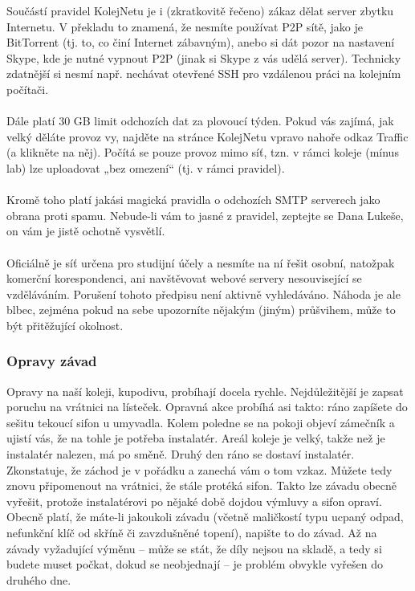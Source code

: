 Součástí pravidel KolejNetu je i (zkratkovitě řečeno) zákaz dělat server zbytku
Internetu. V překladu to znamená, že nesmíte používat P2P sítě, jako je
BitTorrent (tj. to, co činí Internet zábavným), anebo si dát pozor na nastavení
Skype, kde je nutné vypnout P2P (jinak si Skype z vás udělá server). Technicky
zdatnější si nesmí např. nechávat otevřené SSH pro vzdálenou práci na kolejním
počítači.
\\\\
Dále platí 30 GB limit odchozích dat za plovoucí týden. Pokud vás zajímá, jak
velký děláte provoz vy, najděte na stránce KolejNetu vpravo nahoře odkaz Traffic
(a klikněte na něj). Počítá se pouze provoz mimo síť, tzn. v rámci koleje (mínus
lab) lze uploadovat „bez omezení“ (tj. v rámci pravidel).
\\\\
Kromě toho platí jakási magická pravidla o odchozích SMTP serverech jako obrana
proti spamu. Nebude-li vám to jasné z pravidel, zeptejte se Dana Lukeše, on vám
je jistě ochotně vysvětlí.
\\\\
Oficiálně je síť určena pro studijní účely a nesmíte na ní řešit osobní,
natožpak komerční korespondenci, ani navštěvovat webové servery nesouvisející se
vzděláváním. Porušení tohoto předpisu není aktivně vyhledáváno. Náhoda je ale
blbec, zejména pokud na sebe upozorníte nějakým (jiným) průšvihem, může to být
přitěžující okolnost.


\subsubsection{Opravy závad}
Opravy na naší koleji, kupodivu, probíhají docela rychle. Nejdůležitější je
zapsat poruchu na vrátnici na lísteček. Opravná akce probíhá asi takto: ráno
zapíšete do sešitu tekoucí sifon u umyvadla. Kolem poledne se na pokoji objeví
zámečník a ujistí vás, že na tohle je potřeba instalatér. Areál koleje je velký,
takže než je instalatér nalezen, má po směně. Druhý den ráno se dostaví
instalatér. Zkonstatuje, že záchod je v pořádku a zanechá vám o tom vzkaz.
Můžete tedy znovu připomenout na vrátnici, že stále protéká sifon. Takto lze
závadu obecně vyřešit, protože instalatérovi po nějaké době dojdou výmluvy a
sifon opraví. Obecně platí, že máte-li jakoukoli závadu (včetně maličkostí typu
ucpaný odpad, nefunkční klíč od skříně či zavzdušněné topení), napište to do
závad. Až na závady vyžadující výměnu – může se stát, že díly nejsou na skladě,
a tedy si budete muset počkat, dokud se neobjednají – je problém obvykle vyřešen
do druhého dne.

